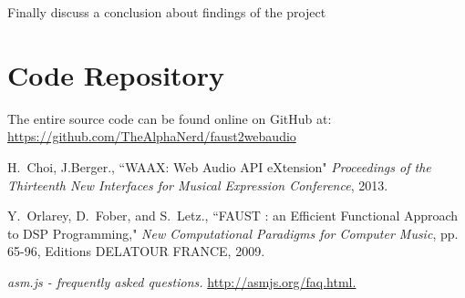 \documentclass[runningheads,a4paper]{llncs}
\begin{document}
Finally discuss a conclusion about findings of the project

\section{Code Repository}

The entire source code can be found online on GitHub at:
\\
\url{https://github.com/TheAlphaNerd/faust2webaudio}

\begin{thebibliography}{1}
	

    H.~Choi, J.Berger., ``WAAX: Web Audio API eXtension"
    \emph{Proceedings of the Thirteenth New Interfaces for Musical Expression Conference}, 2013.
    
	
     Y.~Orlarey, D.~Fober, and S.~Letz., ``FAUST : an Efficient Functional Approach to DSP Programming,"
    \emph{New Computational Paradigms for Computer Music}, pp. 65-96, Editions DELATOUR FRANCE, 2009.

	\textsl{asm.js - frequently asked questions.}
    \newblock \url{http://asmjs.org/faq.html.}
    
    
	
\end{thebibliography}
\end{document}
